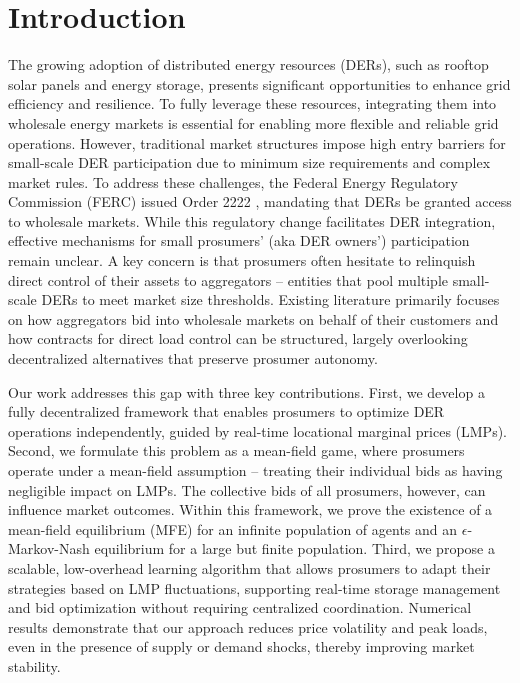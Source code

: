 \documentclass{article}
\theoremstyle{definition}
\theoremstyle{plain}
\begin{document}
\section{Introduction}

The growing adoption of distributed energy resources (DERs), such as rooftop solar panels and energy storage, presents significant opportunities to enhance grid efficiency and resilience. To fully leverage these resources, integrating them into wholesale energy markets is essential for enabling more flexible and reliable grid operations. However, traditional market structures impose high entry barriers for small-scale DER participation due to minimum size requirements and complex market rules. To address these challenges, the Federal Energy Regulatory Commission (FERC) issued Order 2222 \citep{FERC2222}, mandating that DERs be granted access to wholesale markets. While this regulatory change facilitates DER integration, effective mechanisms for small prosumers' (aka DER owners') participation remain unclear. A key concern is that prosumers often hesitate to relinquish direct control of their assets to aggregators -- entities that pool multiple small-scale DERs to meet market size thresholds. Existing literature primarily focuses on how aggregators bid into wholesale markets on behalf of their customers and how contracts for direct load control can be structured, largely overlooking decentralized alternatives that preserve prosumer autonomy.

Our work addresses this gap with three key contributions. First, we develop a fully decentralized framework that enables prosumers to optimize DER operations independently, guided by real-time locational marginal prices (LMPs). Second, we formulate this problem as a mean-field game, where prosumers operate under a mean-field assumption -- treating their individual bids as having negligible impact on LMPs. The collective bids of all prosumers, however, can influence market outcomes. Within this framework, we prove the existence of a mean-field equilibrium (MFE) for an infinite population of agents and an \(\epsilon\)-Markov-Nash equilibrium for a large but finite population. Third, we propose a scalable, low-overhead learning algorithm that allows prosumers to adapt their strategies based on LMP fluctuations, supporting real-time storage management and bid optimization without requiring centralized coordination. Numerical results demonstrate that our approach reduces price volatility and peak loads, even in the presence of supply or demand shocks, thereby improving market stability.
\end{document}
